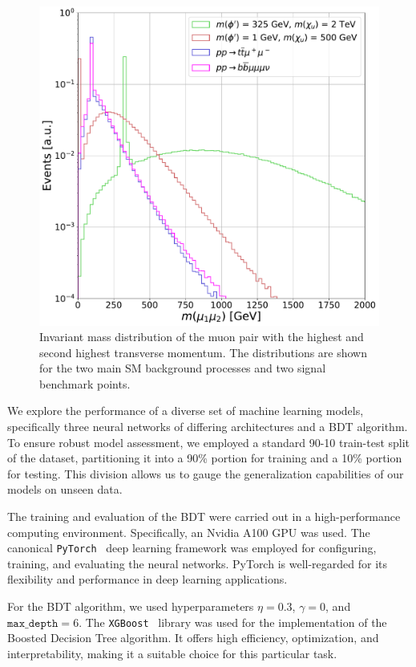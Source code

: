 \begin{figure}
\centering
\includegraphics[width=.95\linewidth]{Images/M_mu_1_2.pdf}
\caption{Invariant mass distribution of the muon pair with the highest and second highest transverse momentum. The distributions are shown for the two main SM background processes and two signal benchmark points.\label{fig:_mu12}}
\end{figure}

We explore the performance of a diverse set of machine learning models, specifically three neural networks of differing architectures and a BDT algorithm. To ensure robust model assessment, we employed a standard 90-10 train-test split of the dataset, partitioning it into a 90\% portion for training and a 10\% portion for testing. This division allows us to gauge the generalization capabilities of our models on unseen data.  

The training and evaluation of the BDT were carried out in a high-performance computing environment. Specifically, an Nvidia A100 GPU was used. The canonical \texttt{PyTorch}~\parencite{paszke2019} deep learning framework was employed for configuring, training, and evaluating the neural networks. PyTorch is well-regarded for its flexibility and performance in deep learning applications.

For the BDT algorithm, we used hyperparameters $\eta=0.3$, $\gamma = 0$, and $\texttt{max\_depth} = 6$. The \texttt{XGBoost}~\parencite{chen_xgboost_2016} library was used for the implementation of the Boosted Decision Tree algorithm. It offers high efficiency, optimization, and interpretability, making it a suitable choice for this particular task. 

